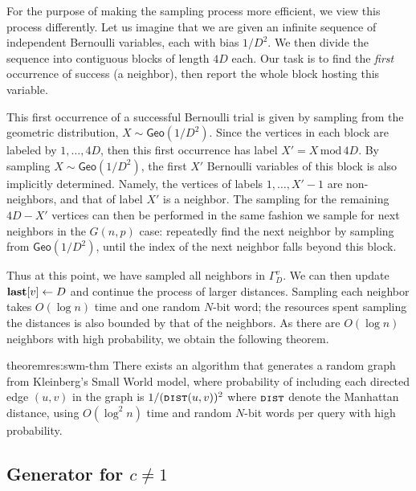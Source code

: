 For the purpose of making the sampling process more efficient, we view this process differently. Let us imagine that we are given an infinite sequence of independent Bernoulli variables, each with bias $1/D^2$.
We then divide the sequence into contiguous blocks of length $4D$ each.
Our task is to find the \emph{first} occurrence of success (a neighbor), then report the whole block hosting this variable.

This first occurrence of a successful Bernoulli trial is given by sampling from the geometric distribution, $X\sim\mathsf{Geo}(1/D^2)$.
Since the vertices in each block are labeled by $1, \ldots, 4D$, then this first occurrence has label $X' = {X\mathrm{\,mod\,}4D}$.
By sampling $X\sim\mathsf{Geo}(1/D^2)$, the first $X'$ Bernoulli variables of this block is also implicitly determined. Namely, the vertices of labels $1, \ldots, X'-1$ are non-neighbors, and that of label $X'$ is a neighbor.
The sampling for the remaining $4D-X'$ vertices can then be performed in the same fashion we sample for next neighbors in the $G(n,p)$ case: 
repeatedly find the next neighbor by sampling from $\mathsf{Geo}(1/D^2)$, until the index of the next neighbor falls beyond this block.

Thus at this point, we have sampled all neighbors in $\Gamma_D^v$. We can then update $\mathbf{last}[v] \leftarrow D$ and continue the process of larger distances.
Sampling each neighbor takes $O(\log n)$ time and one random $N$-bit word; the resources spent sampling the distances is also bounded by that of the neighbors.
As there are $O(\log n)$ neighbors with high probability, we obtain the following theorem.

\begin{restatable}{theorem}{res:swm-thm}\label{thm-swm}
There exists an algorithm that generates a random graph from Kleinberg's Small World model, where probability of including each directed edge $(u,v)$ in the graph is $1/(\texttt{\textsc{dist}}(u,v))^2$ where $\texttt{\textsc{dist}}$ denote the Manhattan distance,
using $O(\log^2 n)$ time and random $N$-bit words per  query with high probability.
\end{restatable}

\subsection{Generator for $c \neq 1$}

